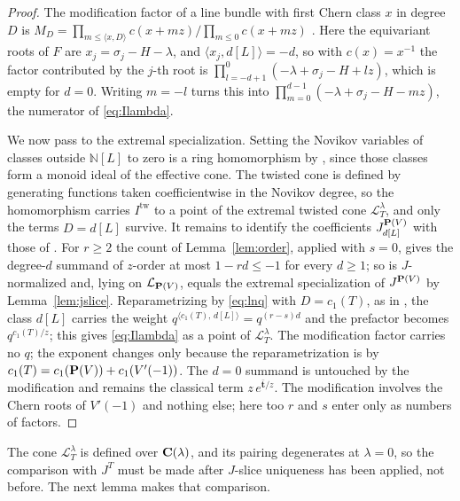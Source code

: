 \begin{proof}
  The modification factor of a line bundle with first Chern class \(x\) in
  degree \(D\) is
  \(M_{D}=\prod_{m\le\langle x,D\rangle}c(x+mz)\big/\prod_{m\le0}c(x+mz)\)
  \cite[Section~4]{CCIT}.  Here the equivariant roots of \(F\) are
  \(x_{j}=\sigma_{j}-H-\lambda\), and \(\langle x_{j},d[L]\rangle=-d\), so with
  \(c(x)=x^{-1}\) the factor contributed by the \(j\)-th root is
  \(\prod_{l=-d+1}^{0}(-\lambda+\sigma_{j}-H+lz)\), which is empty for
  \(d=0\).  Writing \(m=-l\) turns this into
  \(\prod_{m=0}^{d-1}(-\lambda+\sigma_{j}-H-mz)\), the numerator of
  \eqref{eq:Ilambda}.

  We now pass to the extremal specialization.  Setting the Novikov variables
  of classes outside \(\mathbb N[L]\) to zero is a ring homomorphism by
  \cite[Proposition~4.1]{SS}, since those classes form a monoid ideal of the
  effective cone.  The twisted cone is defined by generating functions taken
  coefficientwise in the Novikov degree, so the homomorphism carries
  \(I^{\mathrm{tw}}\) to a point of the extremal twisted cone
  \(\mathcal L^{\lambda}_{T}\), and only the terms \(D=d[L]\) survive.  It
  remains to identify the coefficients \(J^{\mathbf P(V)}_{d[L]}\) with those of
  \cite[(34)]{SS}.  For \(r\ge2\) the count of Lemma~\ref{lem:order},
  applied with \(s=0\), gives the degree-\(d\) summand of \cite[(34)]{SS}
  \(z\)-order at most \(1-rd\le-1\) for every \(d\ge1\); so
  \cite[(34)]{SS} is \(J\)-normalized and, lying on \(\mathcal L_{\mathbf P(V)}\),
  equals the extremal specialization of \(J^{\mathbf P(V)}\) by
  Lemma~\ref{lem:jslice}.  Reparametrizing by \eqref{eq:lnq} with
  \(D=c_{1}(T)\), as in \cite[(33)]{SS}, the class \(d[L]\) carries the
  weight \(q^{\langle c_{1}(T),\,d[L]\rangle}=q^{(r-s)d}\) and the prefactor
  becomes \(q^{c_{1}(T)/z}\); this gives \eqref{eq:Ilambda} as a point of
  \(\mathcal L_{T}^{\lambda}\).  The modification factor carries no \(q\);
  the exponent changes only because the reparametrization is by
  \(c_{1}(T)=c_{1}(\mathbf P(V))+c_{1}(V'(-1))\).  The \(d=0\) summand is untouched
  by the modification and remains the classical term
  \(z\,e^{\bar{\mathbf t}/z}\).  The modification involves the Chern roots of
  \(V'(-1)\) and nothing else; here too \(r\) and \(s\) enter only as numbers
  of factors.
\end{proof}

The cone \(\mathcal L_{T}^{\lambda}\) is defined over \(\mathbf C(\lambda)\), and its
pairing degenerates at \(\lambda=0\), so the comparison with \(J^{T}\) must be
made after \(J\)-slice uniqueness has been applied, not before.  The next
lemma makes that comparison.

